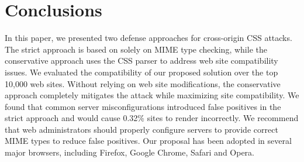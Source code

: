 \documentclass{acm_proc_article-sp}
\begin{document}
\section{Conclusions} \label{sec:conclusion}
In this paper, we presented two defense approaches for cross-origin CSS attacks. The strict approach is based on solely on MIME type
checking, while the conservative approach uses the CSS parser to
address web site compatibility issues. We evaluated the compatibility of our
proposed solution over the top 10,000 web sites. Without relying on web site
modifications, the conservative approach completely mitigates the attack while
maximizing site compatibility. We found that common server misconfigurations
introduced false positives in the strict approach and would cause 0.32\%
sites to render incorrectly. We recommend that web administrators should
properly configure servers to provide correct MIME types to reduce false
positives. Our proposal has been adopted in several major browsers, including
Firefox, Google Chrome, Safari and Opera.



\end{document}
